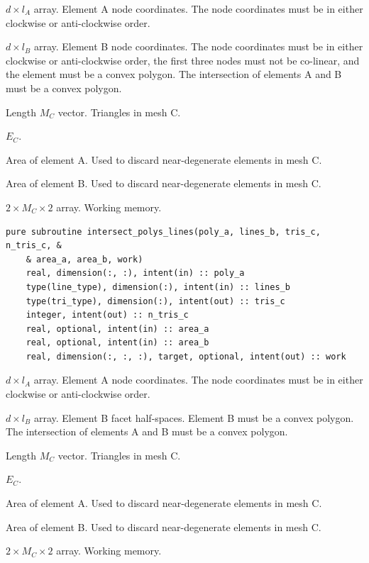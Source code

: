 \documentclass{article}
\begin{document}
\begin{description}[font=\ttfamily\bfseries,leftmargin=2.2\parindent,labelindent=1.7\parindent,noitemsep]
  \item[poly\_a] $d \times l_A$ array. Element A node coordinates. The node
    coordinates must be in either clockwise or anti-clockwise order.
  \item[poly\_b] $d \times l_B$ array. Element B node coordinates. The node
    coordinates must be in either clockwise or anti-clockwise order, the first
    three nodes must not be co-linear, and the element must be a convex polygon.
    The intersection of elements A and B must be a convex polygon.
  \item[tris\_c] Length $M_C$ vector. Triangles in mesh C.
  \item[n\_tris\_c] $E_C$.
  \item[area\_a] Area of element A. Used to discard near-degenerate elements in
    mesh C.
  \item[area\_b] Area of element B. Used to discard near-degenerate elements in
    mesh C.
  \item[work] $2 \times M_C \times 2$ array. Working memory.
\end{description}

\begin{lstlisting}[language=FORTRAN]
  pure subroutine intersect_polys_lines(poly_a, lines_b, tris_c, n_tris_c, &
    & area_a, area_b, work)
    real, dimension(:, :), intent(in) :: poly_a
    type(line_type), dimension(:), intent(in) :: lines_b
    type(tri_type), dimension(:), intent(out) :: tris_c
    integer, intent(out) :: n_tris_c
    real, optional, intent(in) :: area_a
    real, optional, intent(in) :: area_b
    real, dimension(:, :, :), target, optional, intent(out) :: work
\end{lstlisting}

\begin{description}[font=\ttfamily\bfseries,leftmargin=2.2\parindent,labelindent=1.7\parindent,noitemsep]
  \item[poly\_a] $d \times l_A$ array. Element A node coordinates. The node
    coordinates must be in either clockwise or anti-clockwise order.
  \item[lines\_b] $d \times l_B$ array. Element B facet half-spaces. Element B
    must be a convex polygon.
    The intersection of elements A and B must be a convex polygon.
  \item[tris\_c] Length $M_C$ vector. Triangles in mesh C.
  \item[n\_tris\_c] $E_C$.
  \item[area\_a] Area of element A. Used to discard near-degenerate elements in
    mesh C.
  \item[area\_b] Area of element B. Used to discard near-degenerate elements in
    mesh C.
  \item[work] $2 \times M_C \times 2$ array. Working memory.
\end{description}
\end{document}

